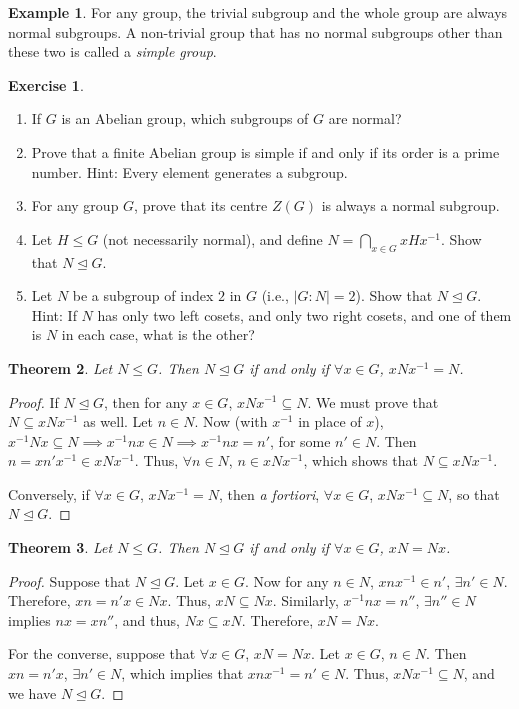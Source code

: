 \documentclass[svgnames]{article}
\newtheorem{Theorem}{Theorem}[section]
\theoremstyle{definition}
\newtheorem{Example}[Theorem]{Example}
\newtheorem{Exercise}{Exercise}[section]
\theoremstyle{remark}
\begin{document}
\begin{Example}
For any group, the trivial subgroup and the whole group are always normal subgroups. A non-trivial group that has no normal subgroups other than these two is called a \emph{simple group}.
\end{Example}

\begin{Exercise}
\begin{enumerate}
\item If $G$ is an Abelian group, which subgroups of $G$ are normal?
\item Prove that a finite Abelian group is simple if and only if its order is a prime number. {\tiny Hint: Every element generates a subgroup.}
\item For any group $G$, prove that its centre $Z(G)$ is always a normal subgroup.
\item Let $H \le G$ (not necessarily normal), and define $N = \bigcap\limits_{x \in G} xHx^{-1}$. Show that $N \unlhd G$.
\item Let $N$ be a subgroup of index $2$ in $G$ (i.e., $|G : N| = 2$). Show that $N \unlhd G$. {\tiny Hint: If $N$ has only two left cosets, and only two right cosets, and one of them is $N$ in each case, what is the other?}
\end{enumerate}
\end{Exercise}

\begin{Theorem}
Let $N \le G$. Then $N \unlhd G$ if and only if $\forall x \in G$, $xNx^{-1} = N$.
\end{Theorem}
\begin{proof}
If $N \unlhd G$, then for any $x \in G$, $xNx^{-1} \subseteq N$. We must prove that $N \subseteq xNx^{-1}$ as well. Let $n \in N$. Now (with $x^{-1}$ in place of $x$), $x^{-1}Nx \subseteq N \implies x^{-1}nx \in N \implies x^{-1}nx = n'$, for some $n' \in N$. Then $n = xn'x^{-1} \in xNx^{-1}$. Thus, $\forall n \in N$, $n \in xNx^{-1}$, which shows that $N \subseteq xNx^{-1}$.

Conversely, if $\forall x \in G$, $xNx^{-1} = N$, then \emph{a fortiori}, $\forall x \in G$, $xNx^{-1} \subseteq N$, so that $N \unlhd G$.
\end{proof}

\begin{Theorem}
Let $N \le G$. Then $N \unlhd G$ if and only if $\forall x \in G$, $xN = Nx$.
\end{Theorem}
\begin{proof}
Suppose that $N \unlhd G$. Let $x \in G$. Now for any $n \in N$, $xnx^{-1} \in n'$, $\exists n' \in N$. Therefore, $xn = n'x \in Nx$. Thus, $xN \subseteq Nx$. Similarly, $x^{-1}nx = n''$, $\exists n'' \in N$ implies $nx = xn''$, and thus, $Nx \subseteq xN$. Therefore, $xN = Nx$.

For the converse, suppose that $\forall x \in G$, $xN = Nx$. Let $x \in G$, $n \in N$. Then $xn = n'x$, $\exists n' \in N$, which implies that $xnx^{-1} = n' \in N$. Thus, $xNx^{-1} \subseteq N$, and we have $N \unlhd G$.
\end{proof}
\end{document}
